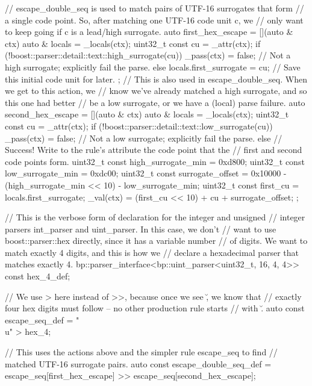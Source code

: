 \begin{code}
{    // escape_double_seq is used to match pairs of UTF-16 surrogates that form
    // a single code point.  So, after matching one UTF-16 code unit c, we
    // only want to keep going if c is a lead/high surrogate.
    auto first_hex_escape = [](auto & ctx) {
        auto & locals = _locals(ctx);
        uint32_t const cu = _attr(ctx);
        if (!boost::parser::detail::text::high_surrogate(cu))
            _pass(ctx) = false; // Not a high surrogate; explicitly fail the parse.
        else
            locals.first_surrogate = cu; // Save this initial code unit for later.
    };
    // This is also used in escape_double_seq.  When we get to this action, we
    // know we've already matched a high surrogate, and so this one had better
    // be a low surrogate, or we have a (local) parse failure.
    auto second_hex_escape = [](auto & ctx) {
        auto & locals = _locals(ctx);
        uint32_t const cu = _attr(ctx);
        if (!boost::parser::detail::text::low_surrogate(cu)) {
            _pass(ctx) = false; // Not a low surrogate; explicitly fail the parse.
        } else {
            // Success!  Write to the rule's attribute the code point that the
            // first and second code points form.
            uint32_t const high_surrogate_min = 0xd800;
            uint32_t const low_surrogate_min = 0xdc00;
            uint32_t const surrogate_offset =
                0x10000 - (high_surrogate_min << 10) - low_surrogate_min;
            uint32_t const first_cu = locals.first_surrogate;
            _val(ctx) = (first_cu << 10) + cu + surrogate_offset;
        }
    };

    // This is the verbose form of declaration for the integer and unsigned
    // integer parsers int_parser and uint_parser.  In this case, we don't
    // want to use boost::parser::hex directly, since it has a variable number
    // of digits.  We want to match exactly 4 digits, and this is how we
    // declare a hexadecimal parser that matches exactly 4.
    bp::parser_interface<bp::uint_parser<uint32_t, 16, 4, 4>> const hex_4_def;

    // We use > here instead of >>, because once we see \u, we know that
    // exactly four hex digits must follow -- no other production rule starts
    // with \u.
    auto const escape_seq_def = "\\u" > hex_4;

    // This uses the actions above and the simpler rule escape_seq to find
    // matched UTF-16 surrogate pairs.
    auto const escape_double_seq_def =
        escape_seq[first_hex_escape] >> escape_seq[second_hex_escape];

}
\end{code}
